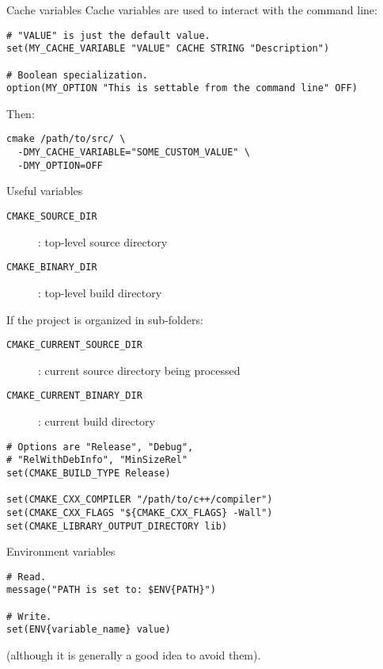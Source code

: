 \documentclass[aspectratio=169,11pt]{beamer}
\begin{document}
\begin{frame}[fragile]{Cache variables}
Cache variables are used to interact with the command line:
\begin{verbatim}
# "VALUE" is just the default value.
set(MY_CACHE_VARIABLE "VALUE" CACHE STRING "Description")

# Boolean specialization.
option(MY_OPTION "This is settable from the command line" OFF)
\end{verbatim}

Then:
\begin{verbatim}
cmake /path/to/src/ \
  -DMY_CACHE_VARIABLE="SOME_CUSTOM_VALUE" \
  -DMY_OPTION=OFF
\end{verbatim}
\end{frame}

\begin{frame}[fragile]{Useful variables}
\begin{description}
    \item[\texttt{CMAKE\_SOURCE\_DIR}]: top-level source directory
    \item[\texttt{CMAKE\_BINARY\_DIR}]: top-level build directory
\end{description}
\vspace{0.4cm}
If the project is organized in sub-folders:
\begin{description}
    \item[\texttt{CMAKE\_CURRENT\_SOURCE\_DIR}]: current source directory being processed
    \item[\texttt{CMAKE\_CURRENT\_BINARY\_DIR}]: current build directory
\end{description}
\vspace{0.2cm}
\begin{verbatim}
# Options are "Release", "Debug",
# "RelWithDebInfo", "MinSizeRel"
set(CMAKE_BUILD_TYPE Release)

set(CMAKE_CXX_COMPILER "/path/to/c++/compiler")
set(CMAKE_CXX_FLAGS "${CMAKE_CXX_FLAGS} -Wall")
set(CMAKE_LIBRARY_OUTPUT_DIRECTORY lib)
\end{verbatim}
\end{frame}

\begin{frame}[fragile]{Environment variables}
\begin{verbatim}
# Read.
message("PATH is set to: $ENV{PATH}")

# Write.
set(ENV{variable_name} value)
\end{verbatim}

(although it is generally a good idea to avoid them).
\end{frame}
\end{document}
